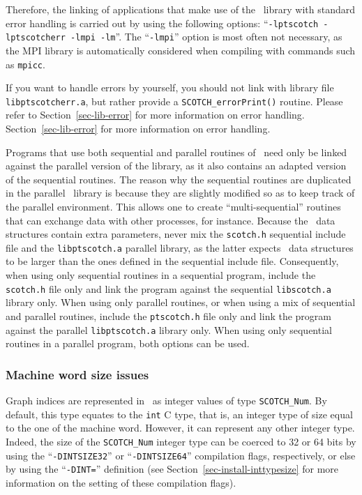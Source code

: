 Therefore, the linking of applications that make use of the
\libscotch\ library with standard error handling is carried out by
using the following options: ``{\tt -lptscotch -lptscotcherr -lmpi -lm}''.
The ``{\tt -lmpi}'' option is most often not necessary, as the MPI
library is automatically considered when compiling with commands such
as {\tt mpicc}.

If you want to handle errors by yourself, you should not link with
library file {\tt libptscotcherr.a}, but rather provide a
{\tt SCOTCH\_\lbt error\lbt Print()} routine. Please refer to
Section~\ref{sec-lib-error} for more information on error handling.
Section~\ref{sec-lib-error} for more information on error handling.

Programs that use both sequential and parallel routines of
\scotch\ need only be linked against the parallel version of the
library, as it also contains an adapted version of the sequential
routines. The reason why the sequential routines are duplicated in the
parallel \ptscotch\ library is because they are slightly modified so
as to keep track of the parallel environment. This allows one to
create ``multi-sequential'' routines that can exchange data with other
processes, for instance. Because the \libscotch\ data structures
contain extra parameters, never mix the \texttt{scotch.h} sequential
include file and the \texttt{libptscotch.a} parallel library, as the
latter expects \scotch\ data structures to be larger than the ones
defined in the sequential include file. Consequently, when using only
sequential routines in a sequential program, include the
\texttt{scotch.h} file only and link the program against the sequential
\texttt{libscotch.a} library only. When using only parallel routines,
or when using a mix of sequential and parallel routines, include the
\texttt{ptscotch.h} file only and link the program against the parallel
\texttt{libptscotch.a} library only. When using only sequential
routines in a parallel program, both options can be used.

\subsubsection{Machine word size issues}
\label{sec-lib-inttypesize}

Graph indices are represented in \scotch\ as integer values of type
{\tt SCOTCH\_\lbt Num}. By default, this type equates to the {\tt int}
C type, that is, an integer type of size equal to the one of 
the machine word. However, it can represent any other integer
type. Indeed, the size of the {\tt SCOTCH\_\lbt Num} integer type can
be coerced to 32 or 64 bits by using the ``{\tt -DINTSIZE32}'' or
``{\tt -DINTSIZE64}'' compilation flags, respectively, or else by
using the ``{\tt -DINT=}'' definition (see
Section~\ref{sec-install-inttypesize} for more information on the
setting of these compilation flags).

